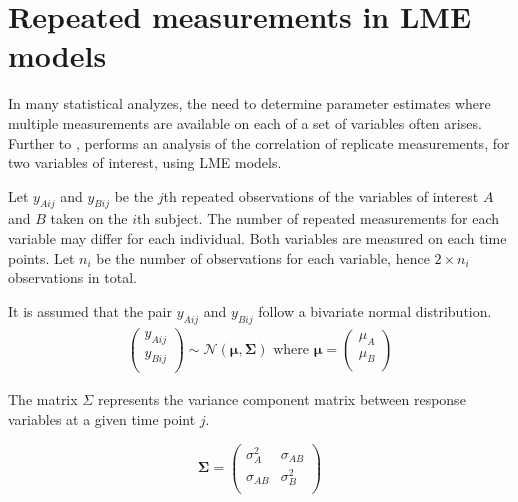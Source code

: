 \documentclass[12pt, a4paper]{report}
\theoremstyle{plain}
\theoremstyle{definition}
\theoremstyle{remark}
\begin{document}
\newpage                                                                    %
\section{Repeated measurements in LME models}

In many statistical analyzes, the need to determine parameter estimates where multiple measurements are available on each of a set of variables often arises. Further to \citet{lam}, \citet{hamlett} performs an analysis of the correlation of replicate measurements, for two variables of interest, using LME models.

Let $y_{Aij}$ and $y_{Bij}$ be the $j$th repeated observations of the variables of interest $A$ and $B$ taken on the $i$th subject. The number of repeated measurements for each variable may differ for each individual.
Both variables are measured on each time points. Let $n_{i}$ be the number of observations for each variable, hence $2\times n_{i}$ observations in total.

It is assumed that the pair $y_{Aij}$ and $y_{Bij}$ follow a bivariate normal distribution.
\begin{eqnarray*}
\left(
  \begin{array}{c}
    y_{Aij} \\
    y_{Bij} \\
  \end{array}
\right) \sim \mathcal{N}(
    \boldsymbol{\mu}, \boldsymbol{\Sigma})\mbox{   where } \boldsymbol{\mu} = \left(
  \begin{array}{c}
    \mu_{A} \\
    \mu_{B} \\
  \end{array}
\right)
\end{eqnarray*}

The matrix $\Sigma$ represents the variance component matrix between response variables at a given time point $j$.

\[
\boldsymbol{\Sigma} = \left( \begin{array}{cc}
                        \sigma^2_{A} & \sigma_{AB} \\
                        \sigma_{AB} & \sigma^2_{B}\\
                      \end{array}   \right)
\]
\end{document}
